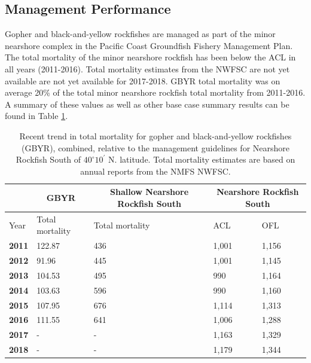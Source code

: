\documentclass[12pt,]{article}
\begin{document}
\FloatBarrier

\subsection*{Management Performance}\label{management-performance}

Gopher and black-and-yellow rockfishes are managed as part of the minor
nearshore complex in the Pacific Coast Groundfish Fishery Management
Plan. The total mortality of the minor nearshore rockfish has been below
the ACL in all years (2011-2016). Total mortality estimates from the
NWFSC are not yet available are not yet available for 2017-2018. GBYR
total mortality was on average 20\% of the total minor nearshore
rockfish total mortality from 2011-2016. A summary of these values as
well as other base case summary results can be found in Table
\ref{tab:mnmgt_perform}.

\begin{table}[ht]
\centering
\caption{Recent trend in total mortality for gopher and 
                            black-and-yellow rockfishes (GBYR), combined, relative to the 
                             management guidelines for Nearshore Rockfish 
                             South of $40^\circ 10^\prime$ N. latitude. 
                             Total mortality estimates are based on annual reports 
                                from the NMFS NWFSC.} 
\label{tab:mnmgt_perform}
\begin{tabular}{lllll}
  \hline
   \multicolumn{1}{c}{} & \multicolumn{1}{c}{GBYR} & \multicolumn{1}{c}{Shallow Nearshore Rockfish South} & \multicolumn{2}{c}{Nearshore Rockfish South} \\  \cmidrule(lr){2-2} \cmidrule(lr){3-3} \cmidrule(lr){4-5}
   \hline
Year & Total mortality & Total mortality & ACL & OFL \\ 
  \hline
\textbf{2011} & 122.87 & 436 & 1,001 & 1,156 \\ 
  \textbf{2012} & 91.96 & 445 & 1,001 & 1,145 \\ 
  \textbf{2013} & 104.53 & 495 & 990 & 1,164 \\ 
  \textbf{2014} & 103.63 & 596 & 990 & 1,160 \\ 
  \textbf{2015} & 107.95 & 676 & 1,114 & 1,313 \\ 
  \textbf{2016} & 111.55 & 641 & 1,006 & 1,288 \\ 
  \textbf{2017} & - & - & 1,163 & 1,329 \\ 
  \textbf{2018} & - & - & 1,179 & 1,344 \\ 
   \hline
   \hline
\end{tabular}
\end{table}
\end{document}
